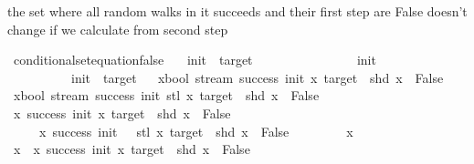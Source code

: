 \begin{isabellebody}
\isanewline
{}\isamarkupfalse%
%
\endisatagproof
{\isafoldproof}%
%
\isadelimproof
%
\endisadelimproof
%
\begin{isamarkuptext}%
the set where all random walks in it succeeds and their first step are False doesn't change if 
we calculate from second step%
\end{isamarkuptext}\isamarkuptrue%
\isamarkupfalse%
\ conditional{\isacharunderscore}{\kern0pt}set{\isacharunderscore}{\kern0pt}equation{\isacharunderscore}{\kern0pt}false{\isacharcolon}{\kern0pt}\isanewline
\ \ \ init\ \ target\isanewline
\ \ \ \isanewline
\ \ \ \ \ \ \ \ \ \ {\isachardoublequoteopen}{}\ {\isacharless}{\kern0pt}\ init{\isachardoublequoteclose}\ \isanewline
\ \ \ \ \ \ \ \ \ \ {\isachardoublequoteopen}init\ {\isacharless}{\kern0pt}\ target{\isachardoublequoteclose}\isanewline
\ \ \isanewline
{\isachardoublequoteopen}{\isacharbraceleft}{\kern0pt}x{\isacharcolon}{\kern0pt}{\isacharcolon}{\kern0pt}bool\ stream{\isachardot}{\kern0pt}\ success\ init\ x\ target\ {\isasymand}\ shd\ x\ {\isacharequal}{\kern0pt}\ False{\isacharbraceright}{\kern0pt}\ {\isacharequal}{\kern0pt}\ \isanewline
\ {\isacharbraceleft}{\kern0pt}x{\isacharcolon}{\kern0pt}{\isacharcolon}{\kern0pt}bool\ stream{\isachardot}{\kern0pt}\ success\ {\isacharparenleft}{\kern0pt}init{\isacharminus}{\kern0pt}{}{\isacharparenright}{\kern0pt}\ {\isacharparenleft}{\kern0pt}stl\ x{\isacharparenright}{\kern0pt}\ target\ {\isasymand}\ shd\ x\ {\isacharequal}{\kern0pt}\ False{\isacharbraceright}{\kern0pt}{\isachardoublequoteclose}\isanewline
%
\isadelimproof
%
\endisadelimproof
%
\isatagproof
{}\isamarkupfalse%
\isanewline
\ \ \isamarkupfalse%
\ {\isachardoublequoteopen}{\isacharbraceleft}{\kern0pt}x{\isachardot}{\kern0pt}\ success\ init\ x\ target\ {\isasymand}\ shd\ x\ {\isacharequal}{\kern0pt}\ False{\isacharbraceright}{\kern0pt}\isanewline
\ \ \ \ {\isasymsubseteq}\ {\isacharbraceleft}{\kern0pt}x{\isachardot}{\kern0pt}\ success\ {\isacharparenleft}{\kern0pt}init\ {\isacharminus}{\kern0pt}\ {}{\isacharparenright}{\kern0pt}\ {\isacharparenleft}{\kern0pt}stl\ x{\isacharparenright}{\kern0pt}\ target\ {\isasymand}\ shd\ x\ {\isacharequal}{\kern0pt}\ False{\isacharbraceright}{\kern0pt}{\isachardoublequoteclose}\isanewline
\ \ \isamarkupfalse%
\isanewline
\ \ \ \ \isamarkupfalse%
\ x\isanewline
\ \ \ \ \isamarkupfalse%
\ {\isachardoublequoteopen}x\ {\isasymin}\ {\isacharbraceleft}{\kern0pt}x{\isachardot}{\kern0pt}\ success\ init\ x\ target\ {\isasymand}\ shd\ x\ {\isacharequal}{\kern0pt}\ False{\isacharbraceright}{\kern0pt}{\isachardoublequoteclose}\ \isanewline

\end{isabellebody}

